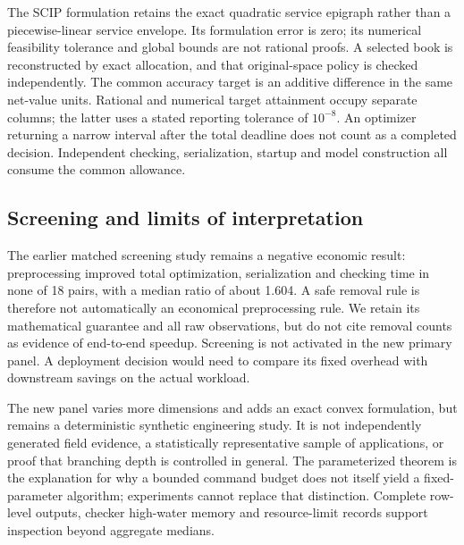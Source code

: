 The SCIP formulation retains the exact quadratic service epigraph rather than a piecewise-linear service envelope. Its formulation error is zero; its numerical feasibility tolerance and global bounds are not rational proofs. A selected book is reconstructed by exact allocation, and that original-space policy is checked independently. The common accuracy target is an additive difference in the same net-value units. Rational and numerical target attainment occupy separate columns; the latter uses a stated reporting tolerance of $10^{-8}$. An optimizer returning a narrow interval after the total deadline does not count as a completed decision. Independent checking, serialization, startup and model construction all consume the common allowance.



\subsection{Screening and limits of interpretation}
The earlier matched screening study remains a negative economic result: preprocessing improved total optimization, serialization and checking time in none of 18 pairs, with a median ratio of about 1.604. A safe removal rule is therefore not automatically an economical preprocessing rule. We retain its mathematical guarantee and all raw observations, but do not cite removal counts as evidence of end-to-end speedup. Screening is not activated in the new primary panel. A deployment decision would need to compare its fixed overhead with downstream savings on the actual workload.

The new panel varies more dimensions and adds an exact convex formulation, but remains a deterministic synthetic engineering study. It is not independently generated field evidence, a statistically representative sample of applications, or proof that branching depth is controlled in general. The parameterized theorem is the explanation for why a bounded command budget does not itself yield a fixed-parameter algorithm; experiments cannot replace that distinction. Complete row-level outputs, checker high-water memory and resource-limit records support inspection beyond aggregate medians.
